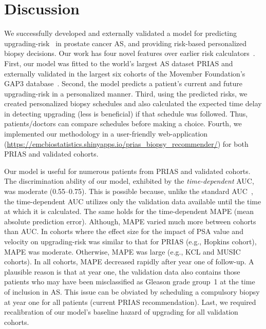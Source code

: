 \section{Discussion}
We successfully developed and externally validated a model for predicting upgrading-risk~\citep{bruinsma2017expert} in prostate cancer AS, and providing risk-based personalized biopsy decisions. Our work has four novel features over earlier risk calculators~\citep{coley2017prediction,ankerst2015precision}. First, our model was fitted to the world's largest AS dataset PRIAS and externally validated in the largest six cohorts of the Movember Foundation's GAP3 database~\citep{gap3_2018}. Second, the model predicts a patient's current and future upgrading-risk in a personalized manner. Third, using the predicted risks, we created personalized biopsy schedules and also calculated the expected time delay in detecting upgrading (less is beneficial) if that schedule was followed. Thus, patients/doctors can compare schedules before making a choice. Fourth, we implemented our methodology in a user-friendly web-application (\url{https://emcbiostatistics.shinyapps.io/prias_biopsy_recommender/}) for both PRIAS and validated cohorts.

Our model is useful for numerous patients from PRIAS and validated cohorts. The discrimination ability of our model, exhibited by the \textit{time-dependent} AUC, was moderate (0.55--0.75). This is possible because, unlike the standard AUC~\citep{steyerberg2010assessing}, the time-dependent AUC utilizes only the validation data available until the time at which it is calculated. The same holds for the time-dependent MAPE (mean absolute prediction error). Although, MAPE varied much more between cohorts than AUC. In cohorts where the effect size for the impact of PSA value and velocity on upgrading-risk was similar to that for PRIAS (e.g., Hopkins cohort), MAPE was moderate. Otherwise, MAPE was large (e.g., KCL and MUSIC cohorts). In all cohorts, MAPE decreased rapidly after year one of follow-up. A plausible reason is that at year one, the validation data also contains those patients who may have been misclassified as Gleason grade group~1 at the time of inclusion in AS. This issue can be obviated by scheduling a compulsory biopsy at year one for all patients (current PRIAS recommendation). Last, we required recalibration of our model's baseline hazard of upgrading for all validation cohorts.

